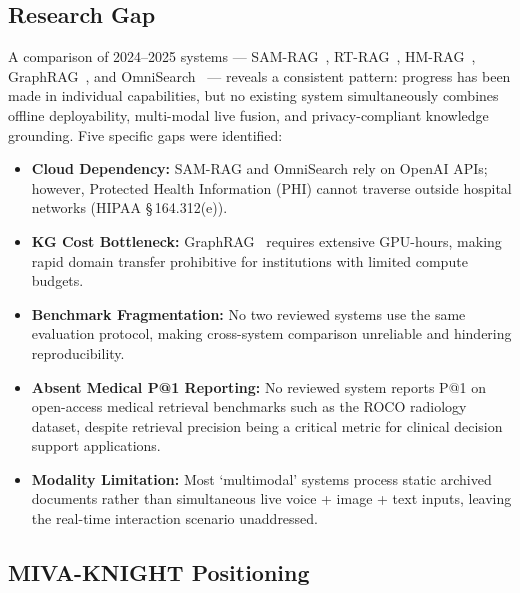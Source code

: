\documentclass[12pt, a4paper]{article}
\begin{document}
\subsection{Research Gap}

A comparison of 2024--2025 systems --- SAM-RAG~\cite{zhai2024samrag},
RT-RAG~\cite{shi2026rtrag}, HM-RAG~\cite{liu2025hmrag},
GraphRAG~\cite{edge2024graphrag}, and
OmniSearch~\cite{li2024omnisearch} --- reveals a consistent pattern: progress
has been made in individual capabilities, but no existing system simultaneously
combines offline deployability, multi-modal live fusion, and
privacy-compliant knowledge grounding. Five specific gaps were identified:

\begin{itemize}[leftmargin=1.5em]
  \item \textbf{Cloud Dependency:} SAM-RAG and OmniSearch rely on OpenAI APIs;
    however, Protected Health Information (PHI) cannot traverse outside
    hospital networks (HIPAA \S\,164.312(e)).

  \item \textbf{KG Cost Bottleneck:}
    GraphRAG~\cite{edge2024graphrag} requires extensive GPU-hours, making rapid
    domain transfer prohibitive for institutions with limited compute budgets.

  \item \textbf{Benchmark Fragmentation:} No two reviewed systems use the same
    evaluation protocol, making cross-system comparison unreliable and
    hindering reproducibility.

  \item \textbf{Absent Medical P@1 Reporting:} No reviewed system reports P@1
    on open-access medical retrieval benchmarks such as the ROCO radiology
    dataset, despite retrieval precision being a critical metric for clinical
    decision support applications.

  \item \textbf{Modality Limitation:} Most `multimodal' systems process static
    archived documents rather than simultaneous live voice + image + text
    inputs, leaving the real-time interaction scenario unaddressed.
\end{itemize}

\subsection{MIVA-KNIGHT Positioning}
\end{document}
